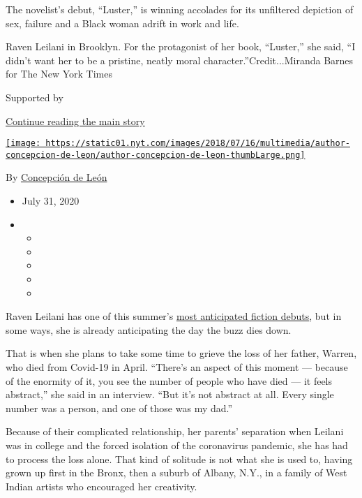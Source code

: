 The novelist's debut, ``Luster,'' is winning accolades for its
unfiltered depiction of sex, failure and a Black woman adrift in work
and life.

Raven Leilani in Brooklyn. For the protagonist of her book, ``Luster,''
she said, ``I didn't want her to be a pristine, neatly moral
character.''Credit...Miranda Barnes for The New York Times

Supported by

\protect\hyperlink{after-sponsor}{Continue reading the main story}

\href{https://www.nytimes.com/by/concepcion-de-leon}{\texttt{[image: https://static01.nyt.com/images/2018/07/16/multimedia/author-concepcion-de-leon/author-concepcion-de-leon-thumbLarge.png]}}

By \href{https://www.nytimes.com/by/concepcion-de-leon}{Concepción de
León}

\begin{itemize}
\item
  July 31, 2020
\item
  \begin{itemize}
  \item
  \item
  \item
  \item
  \item
  \end{itemize}
\end{itemize}

Raven Leilani has one of this summer's
\href{https://www.nytimes.com/2020/07/30/books/new-august-books.html}{most
anticipated fiction debuts}, but in some ways, she is already
anticipating the day the buzz dies down.

That is when she plans to take some time to grieve the loss of her
father, Warren, who died from Covid-19 in April. ``There's an aspect of
this moment --- because of the enormity of it, you see the number of
people who have died --- it feels abstract,'' she said in an interview.
``But it's not abstract at all. Every single number was a person, and
one of those was my dad.''

Because of their complicated relationship, her parents' separation when
Leilani was in college and the forced isolation of the coronavirus
pandemic, she has had to process the loss alone. That kind of solitude
is not what she is used to, having grown up first in the Bronx, then a
suburb of Albany, N.Y., in a family of West Indian artists who
encouraged her creativity.

